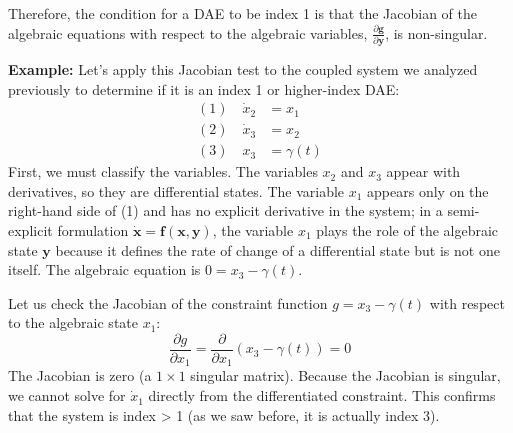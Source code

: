 Therefore, the condition for a DAE to be index 1 is that the Jacobian of the algebraic equations with respect to the algebraic variables, $\frac{\partial \mathbf{g}}{\partial \mathbf{y}}$, is non-singular.


\begin{exampleBox}
\textbf{Example:} Let's apply this Jacobian test to the coupled system we analyzed previously to determine if it is an index 1 or higher-index DAE:
\begin{align}
    (1) \quad \dot{x}_2 &= x_1 \\
    (2) \quad \dot{x}_3 &= x_2 \\
    (3) \quad x_3 &= \gamma(t)
\end{align}
First, we must classify the variables. The variables $x_2$ and $x_3$ appear with derivatives, so they are differential states. The variable $x_1$ appears only on the right-hand side of (1) and has no explicit derivative in the system; in a semi-explicit formulation $\dot{\mathbf{x}}=\mathbf{f}(\mathbf{x}, \mathbf{y})$, the variable $x_1$ plays the role of the algebraic state $\mathbf{y}$ because it defines the rate of change of a differential state but is not one itself. The algebraic equation is $0 = x_3 - \gamma(t)$.

Let us check the Jacobian of the constraint function $g = x_3 - \gamma(t)$ with respect to the algebraic state $x_1$:
\begin{equation}
    \frac{\partial g}{\partial x_1} = \frac{\partial}{\partial x_1}(x_3 - \gamma(t)) = 0
\end{equation}
The Jacobian is zero (a $1\times 1$ singular matrix). Because the Jacobian is singular, we cannot solve for $\dot{x}_1$ directly from the differentiated constraint. This confirms that the system is index > 1 (as we saw before, it is actually index 3).
\end{exampleBox}



